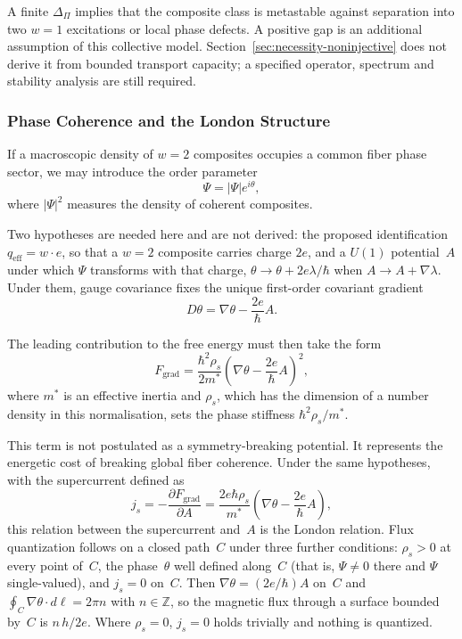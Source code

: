     A finite $\Delta_{\Pi}$ implies that the composite class is metastable against
    separation into two $w=1$ excitations or local phase defects.
    A positive gap is an additional assumption of this collective model.
    Section~\ref{sec:necessity-noninjective} does not derive it from bounded transport capacity;
    a specified operator, spectrum and stability analysis are still required.

  \subsubsection*{Phase Coherence and the London Structure}
    \label{subsubsec:london-structure}

    If a macroscopic density of $w=2$ composites occupies a common fiber phase sector,
    we may introduce the order parameter
    \begin{equation}
      \Psi = |\Psi| e^{i\theta},
    \end{equation}
    where $|\Psi|^2$ measures the density of coherent composites.

    Two hypotheses are needed here and are not derived: the proposed identification
    $q_{\mathrm{eff}} = w \cdot e$, so that a $w=2$ composite carries charge $2e$, and a $U(1)$
    potential~$A$ under which $\Psi$ transforms with that charge, $\theta \to \theta + 2e\lambda/\hbar$ when
    $A \to A + \nabla\lambda$.
    Under them, gauge covariance fixes the unique first-order covariant gradient
    \begin{equation}
      D\theta = \nabla\theta - \frac{2e}{\hbar} A.
    \end{equation}

    The leading contribution to the free energy must then take the form
    \begin{equation}
      F_{\text{grad}} =
      \frac{\hbar^2 \rho_s}{2 m^*}
      \left(\nabla\theta - \frac{2e}{\hbar} A\right)^2,
    \end{equation}
    where $m^*$ is an effective inertia and $\rho_s$, which has the dimension of a number density in this
    normalisation, sets the phase stiffness $\hbar^2\rho_s/m^*$.

    This term is not postulated as a symmetry-breaking potential.
    It represents the energetic cost of breaking global fiber coherence.
    Under the same hypotheses, with the supercurrent defined as
    \begin{equation}
      j_s = -\frac{\partial F_{\text{grad}}}{\partial A}
        = \frac{2e\hbar\rho_s}{m^*}\left(\nabla\theta - \frac{2e}{\hbar} A\right),
    \end{equation}
    this relation between the supercurrent and~$A$ is the London relation.
    Flux quantization follows on a closed path~$C$ under three further conditions: $\rho_s > 0$ at every point
    of~$C$, the phase~$\theta$ well defined along~$C$ (that is, $\Psi \neq 0$ there and $\Psi$ single-valued), and
    $j_s = 0$ on~$C$.
    Then $\nabla\theta = (2e/\hbar)A$ on~$C$ and $\oint_C \nabla\theta \cdot d\ell = 2\pi n$ with $n \in \mathbb{Z}$,
    so the magnetic flux through a surface bounded by~$C$ is $n\,h/2e$.
    Where $\rho_s = 0$, $j_s = 0$ holds trivially and nothing is quantized.

